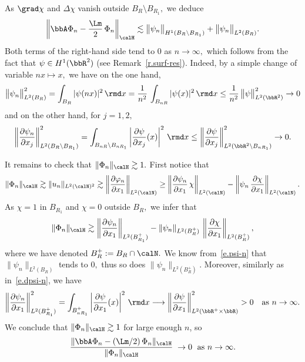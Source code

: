 \begin{proofc}
\begin{step}
As $\grad\chi$ and $\Delta \chi$ vanish outside $B_R \setminus B_{R_1},$ we deduce
\[
\left\| \bbA \Phi_n - \frac{\Lm}{2}\, \Phi_n \right\|_\calH
\lesssim
\big\| \psi_n \big\|_{H^1(B_R \setminus B_{R_1})} + \big\| \psi_n \big\|_{L^2(B_R)}.
\]
Both terms of the right-hand side tend to $0$ as $n \to \infty,$ which follows from the fact that $\psi \in H^1(\bbR^2)$ (see Remark~\ref{r.surf-res}). Indeed, by a simple change of variable $nx \mapsto x,$ we have on the one hand,
\begin{equation}\label{e.psi-n}
\big\| \psi_n \big\|_{L^2(B_R)}^2 = \int_{B_R} |\psi(nx)|^2\,\rmd x = \frac{1}{n^2}\, \int_{B_{nR}} |\psi(x)|^2\,\rmd x
\leq \frac{1}{n^2}\, \big\| \psi \big\|_{L^2(\bbR^2)}^2
\to 0
\end{equation}
and on the other hand, for $j=1,2,$
\begin{equation}\label{e.dpsi-n}
\left\| \frac{\partial \psi_n}{\partial x_j}\right\|_{L^2(B_R \setminus B_{R_1})}^2 = \int_{B_{nR} \setminus B_{nR_1}} \left| \frac{\partial \psi}{\partial x_j} (x) \right|^2 \,\rmd x
\leq \left\| \frac{\partial \psi}{\partial x_j}\right\|_{L^2(\bbR^2 \setminus B_{nR_1})}^2
\to 0.
\end{equation}

It remains to check that $\| \Phi_n \|_\calH \gtrsim 1.$ First notice that
\[
\| \Phi_n \|_\calH
\gtrsim \|u_n\|_{L^2(\calN)^2}
\gtrsim \left\| \frac{\partial \varphi_n}{\partial x_1} \right\|_{L^2(\calN)}
\geq \left\| \frac{\partial \psi_n}{\partial x_1}\, \chi \right\|_{L^2(\calN)} - \left\| \psi_n\, \frac{\partial \chi}{\partial x_1} \right\|_{L^2(\calN)}.
\]
As $\chi = 1$ in $B_{R_1}$ and $\chi = 0$ outside $B_R,$ we infer that
\[
\| \Phi_n \|_\calH
\gtrsim \left\| \frac{\partial \psi_n}{\partial x_1} \right\|_{L^2(B_{R_1}^+)} - \left\| \psi_n \right\|_{L^2(B_R^+)}
\,\left\| \frac{\partial \chi}{\partial x_1} \right\|_{L^2(B_R^+)},
\]
where we have denoted $B_R^+ := B_R \cap \calN.$ We know from~\eqref{e.psi-n} that $\| \psi_n \|_{L^2(B_R)}$ tends to $0,$ thus so does $\| \psi_n \|_{L^2(B_R^+)}$. Moreover, similarly as in~\eqref{e.dpsi-n}, we have
\[
\left\| \frac{\partial \psi_n}{\partial x_1}\right\|_{L^2(B_{R_1}^+)}^2 = \int_{B_{nR_1}^+} \left| \frac{\partial \psi}{\partial x_1} (x) \right|^2 \,\rmd x
\longrightarrow \left\| \frac{\partial \psi}{\partial x_1}\right\|_{L^2(\bbR^+ \times \bbR)}^2 > 0
\quad\text{as } n \to \infty.
\]
We conclude that $\| \Phi_n \|_\calH \gtrsim 1$ for large enough $n$, so 
\[
\frac{\| \bbA \Phi_n - (\Lm/2)\,\Phi_n\|_\calH}{\| \Phi_n\|_\calH}
\;\to 0\;\text{ as } n \to \infty.
\] 
\end{step}



\end{proofc}
